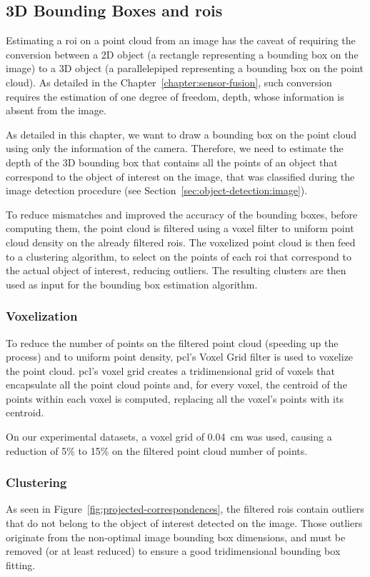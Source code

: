 \subsection{3D Bounding Boxes and \aclp{roi}}
\label{subsec:object-detection:bounding-boxes-and-roi}
Estimating a \ac{roi} on a point cloud from an image has the caveat of requiring the conversion between a 2D object (a rectangle representing a bounding box on the image) to a 3D object (a parallelepiped representing a bounding box on the point cloud). As detailed in the Chapter~\ref{chapter:sensor-fusion}, such conversion requires the estimation of one degree of freedom, depth, whose information is absent from the image.

As detailed in this chapter, we want to draw a bounding box on the point cloud using only the information of the camera. Therefore, we need to estimate the depth of the 3D bounding box that contains all the points of an object that correspond to the object of interest on the image, that was classified during the image detection procedure (see Section~\ref{sec:object-detection:image}).

To reduce mismatches and improved the accuracy of the bounding boxes, before computing them, the point cloud is filtered using a voxel filter to uniform point cloud density on the already filtered \acp{roi}. The voxelized point cloud is then feed to a clustering algorithm, to select on the points of each \ac{roi} that correspond to the actual object of interest, reducing outliers. The resulting clusters are then used as input for the bounding box estimation algorithm.


\subsubsection{Voxelization}
To reduce the number of points on the filtered point cloud (speeding up the process) and to uniform point density, \ac{pcl}'s Voxel Grid filter is used to voxelize the point cloud. \ac{pcl}'s voxel grid creates a tridimensional grid of voxels that encapsulate all the point cloud points and, for every voxel, the centroid of the points within each voxel is computed, replacing all the voxel's points with its centroid.

On our experimental datasets, a voxel grid of \SI{0.04}{\centi\meter} was used, causing a reduction of 5\% to 15\% on the filtered point cloud number of points.

\subsubsection{Clustering}
As seen in Figure~\ref{fig:projected-correspondences}, the filtered \acp{roi} contain outliers that do not belong to the object of interest detected on the image. Those outliers originate from the non-optimal image bounding box dimensions, and must be removed (or at least reduced) to ensure a good tridimensional bounding box fitting.

